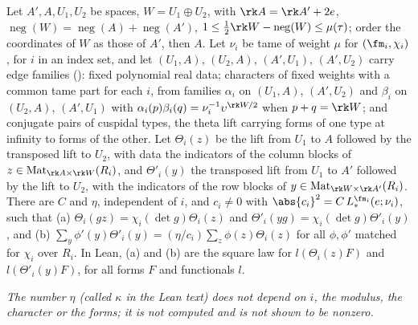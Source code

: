 \begin{theorem}
\label{det-exchange:thm:square}
Let $A',A,U_1,U_2$ be spaces, $W=U_1\oplus U_2$, with $\rk A=\rk A'+2e$,
$\operatorname{neg}(W)=\operatorname{neg}(A)+\operatorname{neg}(A')$,
$1\le\frac12\rk W-\operatorname{neg}(W)\le\mu(\tau)$; order the coordinates of $W$ as those of $A'$,
then $A$. Let $\nu_i$ be tame of weight $\mu$ for $(\fm_i,\chi_i)$, for $i$ in an index set, and let
$(U_1,A)$, $(U_2,A)$, $(A',U_1)$, $(A',U_2)$ carry edge families ():
fixed polynomial real data; characters of fixed weights with a common tame part for each $i$, from
families $\alpha_i$ on $(U_1,A)$, $(A',U_2)$ and $\beta_i$ on $(U_2,A)$, $(A',U_1)$ with
$\alpha_i(p)\beta_i(q)=\nu_i^{-1}\upsilon^{\rk W/2}$ when $p+q=\rk W$; and conjugate pairs of cuspidal types,
the theta lift carrying forms of one type at infinity to forms of the other. Let $\Theta_i(z)$ be the lift from $U_1$ to $A$ followed by the transposed lift to
$U_2$, with data the indicators of the column blocks of $z\in\mathrm{Mat}_{\rk A\times\rk W}(R_i)$,
and $\Theta'_i(y)$ the transposed lift from $U_1$ to $A'$ followed by the lift to $U_2$, with the
indicators of the row blocks of $y\in\mathrm{Mat}_{\rk W\times\rk A'}(R_i)$. There are $C$ and
$\eta$, independent of $i$, and $c_i\ne0$ with $\abs{c_i}^2=C\,L_*^{\fm_i}(e;\nu_i)$, such that
(a) $\Theta_i(gz)=\chi_i(\det g)\Theta_i(z)$ and $\Theta'_i(yg)=\chi_i(\det g)\Theta'_i(y)$, and
(b) $\sum_y\phi'(y)\Theta'_i(y)=(\eta/c_i)\sum_z\phi(z)\Theta_i(z)$ for all $\phi,\phi'$ matched for
$\chi_i$ over $R_i$. In Lean, (a) and (b) are the square law  for
$l(\Theta_i(z)F)$ and $l(\Theta'_i(y)F)$, for all forms $F$ and functionals $l$.
\end{theorem}

\emph{The number $\eta$ (called $\kappa$ in the Lean text) does not depend on $i$, the modulus, the
character or the forms; it is not computed and is not shown to be nonzero.}

